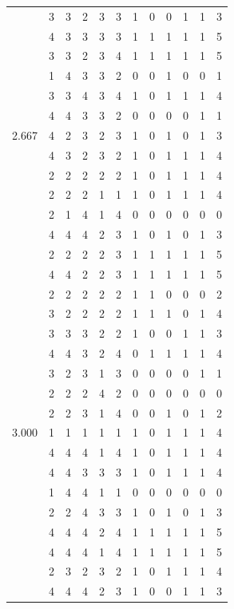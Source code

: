 \documentclass[]{book}
\theoremstyle{definition}
\theoremstyle{definition}
\theoremstyle{definition}
\theoremstyle{remark}
\begin{document}
\begin{table}
{\begin{tabular}[t]{rrrrrrrrrrrr}
 & 3 & 3 & 2 & 3 & 3 & 1 & 0 & 0 & 1 & 1 & 3\\
 & 4 & 3 & 3 & 3 & 3 & 1 & 1 & 1 & 1 & 1 & 5\\
 & 3 & 3 & 2 & 3 & 4 & 1 & 1 & 1 & 1 & 1 & 5\\
 & 1 & 4 & 3 & 3 & 2 & 0 & 0 & 1 & 0 & 0 & 1\\
 & 3 & 3 & 4 & 3 & 4 & 1 & 0 & 1 & 1 & 1 & 4\\
 & 4 & 4 & 3 & 3 & 2 & 0 & 0 & 0 & 0 & 1 & 1\\
2.667 & 4 & 2 & 3 & 2 & 3 & 1 & 0 & 1 & 0 & 1 & 3\\
 & 4 & 3 & 2 & 3 & 2 & 1 & 0 & 1 & 1 & 1 & 4\\
 & 2 & 2 & 2 & 2 & 2 & 1 & 0 & 1 & 1 & 1 & 4\\
 & 2 & 2 & 2 & 1 & 1 & 1 & 0 & 1 & 1 & 1 & 4\\
 & 2 & 1 & 4 & 1 & 4 & 0 & 0 & 0 & 0 & 0 & 0\\
 & 4 & 4 & 4 & 2 & 3 & 1 & 0 & 1 & 0 & 1 & 3\\
 & 2 & 2 & 2 & 2 & 3 & 1 & 1 & 1 & 1 & 1 & 5\\
 & 4 & 4 & 2 & 2 & 3 & 1 & 1 & 1 & 1 & 1 & 5\\
 & 2 & 2 & 2 & 2 & 2 & 1 & 1 & 0 & 0 & 0 & 2\\
 & 3 & 2 & 2 & 2 & 2 & 1 & 1 & 1 & 0 & 1 & 4\\
 & 3 & 3 & 3 & 2 & 2 & 1 & 0 & 0 & 1 & 1 & 3\\
 & 4 & 4 & 3 & 2 & 4 & 0 & 1 & 1 & 1 & 1 & 4\\
 & 3 & 2 & 3 & 1 & 3 & 0 & 0 & 0 & 0 & 1 & 1\\
 & 2 & 2 & 2 & 4 & 2 & 0 & 0 & 0 & 0 & 0 & 0\\
 & 2 & 2 & 3 & 1 & 4 & 0 & 0 & 1 & 0 & 1 & 2\\
3.000 & 1 & 1 & 1 & 1 & 1 & 1 & 0 & 1 & 1 & 1 & 4\\
 & 4 & 4 & 4 & 1 & 4 & 1 & 0 & 1 & 1 & 1 & 4\\
 & 4 & 4 & 3 & 3 & 3 & 1 & 0 & 1 & 1 & 1 & 4\\
 & 1 & 4 & 4 & 1 & 1 & 0 & 0 & 0 & 0 & 0 & 0\\
 & 2 & 2 & 4 & 3 & 3 & 1 & 0 & 1 & 0 & 1 & 3\\
 & 4 & 4 & 4 & 2 & 4 & 1 & 1 & 1 & 1 & 1 & 5\\
 & 4 & 4 & 4 & 1 & 4 & 1 & 1 & 1 & 1 & 1 & 5\\
 & 2 & 3 & 2 & 3 & 2 & 1 & 0 & 1 & 1 & 1 & 4\\
 & 4 & 4 & 4 & 2 & 3 & 1 & 0 & 0 & 1 & 1 & 3\\

\end{tabular}}
\end{table}
\end{document}
